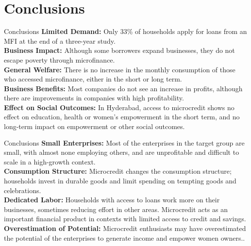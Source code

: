 \documentclass[10pt]{beamer}
\begin{document}
\section{Conclusions}
\begin{frame}{Conclusions}
\justifying
\textbf{Limited Demand:} Only 33\% of households apply for loans from an MFI at the end of a three-year study.\\
\vspace{\baselineskip}
\textbf{Business Impact:} Although some borrowers expand businesses, they do not escape poverty through microfinance.\\
\vspace{\baselineskip}
\textbf{General Welfare:} There is no increase in the monthly consumption of those who accessed microfinance, either in the short or long term.\\
\vspace{\baselineskip}
\textbf{Business Benefits:} Most companies do not see an increase in profits, although there are improvements in companies with high profitability.\\
\vspace{\baselineskip}
\textbf{Effect on Social Outcomes:} In Hyderabad, access to microcredit shows no effect on education, health or women's empowerment in the short term, and no long-term impact on empowerment or other social outcomes.\\
\end{frame}

\begin{frame}{Conclusions}
\justifying
\textbf{Small Enterprises:} Most of the enterprises in the target group are small, with almost none employing others, and are unprofitable and difficult to scale in a high-growth context.\\
\vspace{\baselineskip}
\textbf{Consumption Structure:} Microcredit changes the consumption structure; households invest in durable goods and limit spending on tempting goods and celebrations.\\
\vspace{\baselineskip}
\textbf{Dedicated Labor:} Households with access to loans work more on their businesses, sometimes reducing effort in other areas. Microcredit acts as an important financial product in contexts with limited access to credit and savings.\\
\vspace{\baselineskip}
\textbf{Overestimation of Potential:} Microcredit enthusiasts may have overestimated the potential of the enterprises to generate income and empower women owners..\\
\end{frame}
\end{document}
